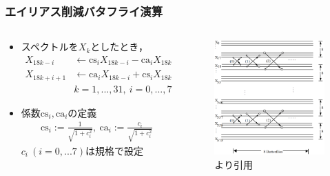 \documentclass[14pt,xcolor=dvipsnames,table,dvipdfmx]{beamer}
\begin{document}
\begin{frame}[c]
    \frametitle{エイリアス削減バタフライ演算}
    \begin{columns}
        \begin{column}{0.60\textwidth}
            \small
            \begin{itemize}
                \item スペクトルを$X_{k}$としたとき，
                    \begin{align}
                        X_{18k - i} &\leftarrow \mathrm{cs}_{i} X_{18k - i} - \mathrm{ca}_{i} X_{18k + i + 1} \\
                        X_{18k + i + 1} &\leftarrow \mathrm{ca}_{i} X_{18k - i} + \mathrm{cs}_{i} X_{18k + i + 1} \\
                        & k = 1,...,31,\ i = 0,...,7 \nonumber
                    \end{align}
                \item 係数$\mathrm{cs}_{i},\mathrm{ca}_{i}$の定義
                    \begin{align}
                        \mathrm{cs}_{i} := \frac{1}{\sqrt{1 + c_{i}^{2}}},\ \mathrm{ca}_{i} := \frac{c_{i}}{\sqrt{1 + c_{i}^{2}}}
                    \end{align}
                    $c_{i}\ (i=0,...7)$は規格で設定
            \end{itemize}
        \end{column}
        \begin{column}{0.43\textwidth}
            \begin{figure}
                \includegraphics[width=52mm]{./figs/butterfly_reduction_alias.png}
                \caption*{\cite{raissi2002theory}より引用}
            \end{figure}
        \end{column}
        \end{columns}
\end{frame}
\end{document}
